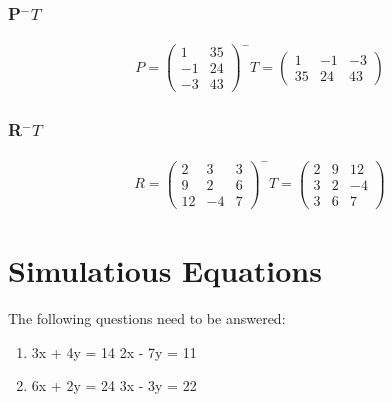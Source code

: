 \documentclass[a4paper,10pt]{article}
\begin{document}
        \subsubsection{P$^-T$}
          \begin{align*}
            P =
            \begin{pmatrix}
              1 & 35\\
             -1 & 24\\
             -3 & 43
            \end{pmatrix}
            ^-T
             =
            \begin{pmatrix}
               1 & -1 & -3\\
              35 & 24 & 43
            \end{pmatrix}
          \end{align*}

        \subsubsection{R$^-T$}
          \begin{align*}
            R =
            \begin{pmatrix}
              2 &  3 & 3\\
              9 &  2 & 6\\
             12 & -4 & 7
            \end{pmatrix}
            ^-T
             =
            \begin{pmatrix}
               2 & 9 & 12\\
               3 & 2 & -4\\
               3 & 6 &  7
            \end{pmatrix}
          \end{align*}

    \newpage

    \section{Simulatious Equations}
      The following questions need to be answered:

      \begin{enumerate}
        \item 3x + 4y = 14
              2x - 7y = 11
        \item 6x + 2y = 24
              3x - 3y = 22
      \end{enumerate}
\end{document}

